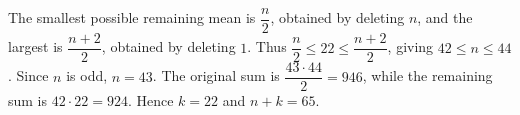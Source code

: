 The smallest possible remaining mean is $\dfrac{n}{2}$, obtained by deleting $n$, and the largest is $\dfrac{n+2}{2}$, obtained by deleting $1$. Thus $\dfrac{n}{2}\le22\le\dfrac{n+2}{2}$, giving $42\le n\le44$. Since $n$ is odd, $n=43$. The original sum is $\dfrac{43\cdot44}{2}=946$, while the remaining sum is $42\cdot22=924$. Hence $k=22$ and $\boxed{n+k=65}$.
